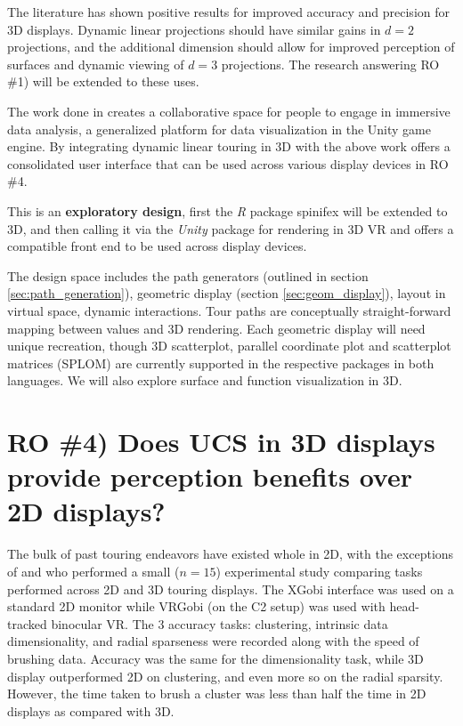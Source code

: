 \documentclass{monashthesis}
\begin{document}
The literature has shown positive results for improved accuracy and
precision for 3D displays. Dynamic linear projections should have
similar gains in \(d=2\) projections, and the additional dimension
should allow for improved perception of surfaces and dynamic viewing of
\(d=3\) projections. The research answering RO \#1) will be extended to
these uses.

The work done in \textcite{cordeil_imaxes:_2017} creates a collaborative
space for people to engage in immersive data analysis, a generalized
platform for data visualization in the Unity game engine. By integrating
dynamic linear touring in 3D with the above work offers a consolidated
user interface that can be used across various display devices in RO
\#4.

This is an \textbf{exploratory design}, first the \emph{R} package
spinifex will be extended to 3D, and then calling it via the
\emph{Unity} package for rendering in 3D VR and offers a compatible
front end to be used across display devices.

The design space includes the path generators (outlined in section
\ref{sec:path_generation}), geometric display (section
\ref{sec:geom_display}), layout in virtual space, dynamic interactions.
Tour paths are conceptually straight-forward mapping between values and
3D rendering. Each geometric display will need unique recreation, though
3D scatterplot, parallel coordinate plot and scatterplot matrices
(SPLOM) are currently supported in the respective packages in both
languages. We will also explore surface and function visualization in
3D.

\section{RO \#4) Does UCS in 3D displays provide perception benefits
over 2D displays?}\label{UCS_3dvs2d}

The bulk of past touring endeavors have existed whole in 2D, with the
exceptions of \textcite{nelson_xgobi_1998} and
\textcite{arms_benefits_1999} who performed a small (\(n=15\))
experimental study comparing tasks performed across 2D and 3D touring
displays. The XGobi interface was used on a standard 2D monitor while
VRGobi (on the C2 setup) was used with head-tracked binocular VR. The 3
accuracy tasks: clustering, intrinsic data dimensionality, and radial
sparseness were recorded along with the speed of brushing data. Accuracy
was the same for the dimensionality task, while 3D display outperformed
2D on clustering, and even more so on the radial sparsity. However, the
time taken to brush a cluster was less than half the time in 2D displays
as compared with 3D.
\end{document}
